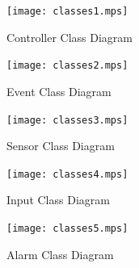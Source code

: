 \documentclass{report}
\begin{document}
\makeatletter
\@fpsep\textheight
\makeatother

\begin{landscape}
\begin{figure}[hp]
    \centering
        \caption{Controller Class Diagram}
        \scriptsize
        \setlength{\unitlength}{2.0em}
        \vspace{140pt}
        \texttt{[image: classes1.mps]}
        \normalsize
    \label{fig:controller_class_diagram}
\end{figure}
\end{landscape}

\begin{landscape}
\begin{figure}[hp]
    \centering
        \caption{Event Class Diagram}
        \scriptsize
        \setlength{\unitlength}{2.0em}
        \vspace{40pt}
        \texttt{[image: classes2.mps]}
        \normalsize
    \label{fig:event_class_diagram}
\end{figure}
\end{landscape}

\begin{landscape}
\begin{figure}[hp]
    \centering
        \caption{Sensor Class Diagram}
        \scriptsize
        \setlength{\unitlength}{2.0em}
        \vspace{100pt}
        \texttt{[image: classes3.mps]}
        \normalsize
    \label{fig:sensor_class_diagram} 
\end{figure}
\end{landscape}

\begin{figure}[hp]
    \centering
        \caption{Input Class Diagram}
        \scriptsize
        \setlength{\unitlength}{2.0em}
        \vspace{3in}
        \texttt{[image: classes4.mps]}
        \normalsize
    \label{fig:input_class_diagram}
\end{figure}

\begin{landscape}
\begin{figure}[hp]
    \centering
        \caption{Alarm Class Diagram}
        \scriptsize
        \setlength{\unitlength}{2.0em}
        \vspace{1.3in}
        \texttt{[image: classes5.mps]}
        \normalsize
    \label{fig:alarm_class_diagram}
\end{figure}
\end{landscape}
\end{document}
